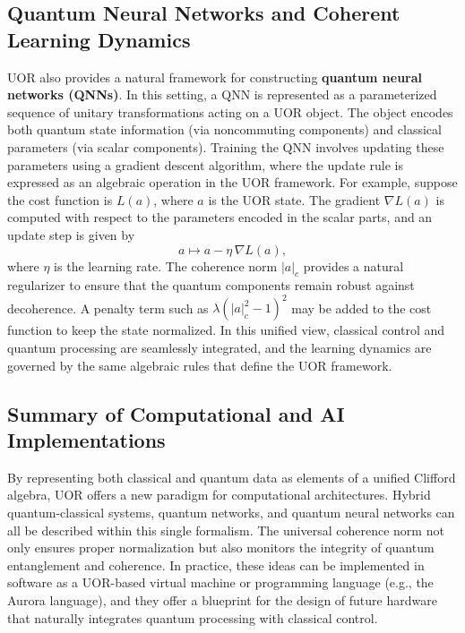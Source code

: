 \documentclass[12pt]{article}
\begin{document}
\subsection{Quantum Neural Networks and Coherent Learning Dynamics}
UOR also provides a natural framework for constructing \textbf{quantum neural networks (QNNs)}. In this setting, a QNN is represented as a parameterized sequence of unitary transformations acting on a UOR object. The object encodes both quantum state information (via noncommuting components) and classical parameters (via scalar components). Training the QNN involves updating these parameters using a gradient descent algorithm, where the update rule is expressed as an algebraic operation in the UOR framework. For example, suppose the cost function is $L(a)$, where $a$ is the UOR state. The gradient $\nabla L(a)$ is computed with respect to the parameters encoded in the scalar parts, and an update step is given by 
\[
a \mapsto a - \eta \, \nabla L(a),
\]
where $\eta$ is the learning rate. The coherence norm $|a|_c$ provides a natural regularizer to ensure that the quantum components remain robust against decoherence. A penalty term such as $\lambda (|a|_c^2-1)^2$ may be added to the cost function to keep the state normalized. In this unified view, classical control and quantum processing are seamlessly integrated, and the learning dynamics are governed by the same algebraic rules that define the UOR framework.

\subsection{Summary of Computational and AI Implementations}
By representing both classical and quantum data as elements of a unified Clifford algebra, UOR offers a new paradigm for computational architectures. Hybrid quantum-classical systems, quantum networks, and quantum neural networks can all be described within this single formalism. The universal coherence norm not only ensures proper normalization but also monitors the integrity of quantum entanglement and coherence. In practice, these ideas can be implemented in software as a UOR-based virtual machine or programming language (e.g., the Aurora language), and they offer a blueprint for the design of future hardware that naturally integrates quantum processing with classical control.
\end{document}

